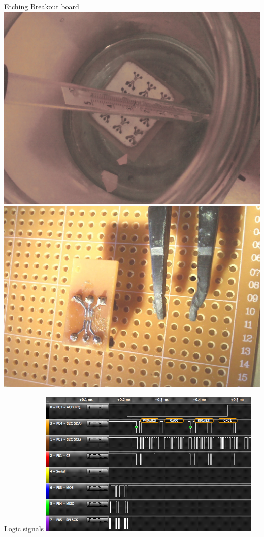 	\begin{frame}{Etching Breakout board}
		\centering
		\includegraphics[height=0.5\textheight]{etching.jpg}
		\includegraphics[height=0.5\textheight]{breakout.jpg}
	\end{frame}

	\begin{frame}{Logic signals}
		\centering
		\includegraphics[width=0.8\textwidth]{logic.png}
	\end{frame}


